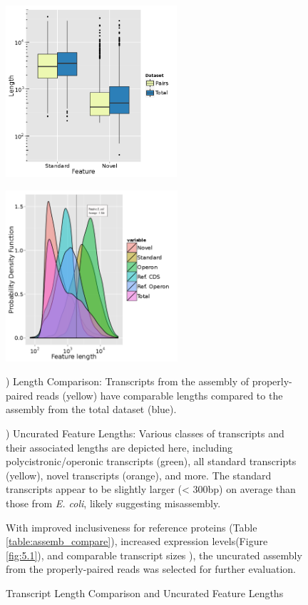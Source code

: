 \begin{figure}[t]
\small
\begin{center}
\begin{minipage}{.5\textwidth}
\begin{center}
{\includegraphics[width=\linewidth,height=2.5in]{images/Assembly/Comparison/TotvsPaired_length.png}
\label{fig:5.2a}}
\end{center}
\end{minipage}%
\begin{minipage}{.5\textwidth}
\begin{center}
{\includegraphics[width=\linewidth,height=2.5in]{images/Assembly/Summary/ffeature_length_1.png}
\label{fig:5.2b}}
\end{center}
\end{minipage}
\end{center}
\caption{Transcript Length Comparison and Uncurated Feature Lengths}
) Length Comparison: Transcripts from the assembly of properly-paired reads (yellow) have comparable lengths compared to the assembly from the total dataset (blue). 

) Uncurated Feature Lengths: Various classes of transcripts and their associated lengths are depicted here, including polycistronic/operonic transcripts (green), all standard transcripts (yellow), novel transcripts (orange), and more. The standard transcripts appear to be slightly larger (< 300bp) on average than those from \textit{E. coli},\cite{86} likely suggesting misassembly.


With improved inclusiveness for reference proteins (Table \ref{table:assemb_compare}), increased expression levels(Figure \ref{fig:5.1}), and comparable transcript sizes ), the uncurated assembly from the properly-paired reads was selected for further evaluation.
\end{figure}


